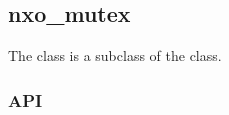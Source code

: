 %
%
%
%
%

\subsection{nxo\_mutex}
\label{nxo_mutex}

The  class is a subclass of the  class.

\subsubsection{API}
